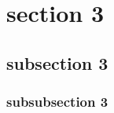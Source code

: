 \section{section 3} \label{sec3}

\subsection{subsection 3} \label{sec3:1}

\subsubsection{subsubsection 3} \label{sec3:1:1}